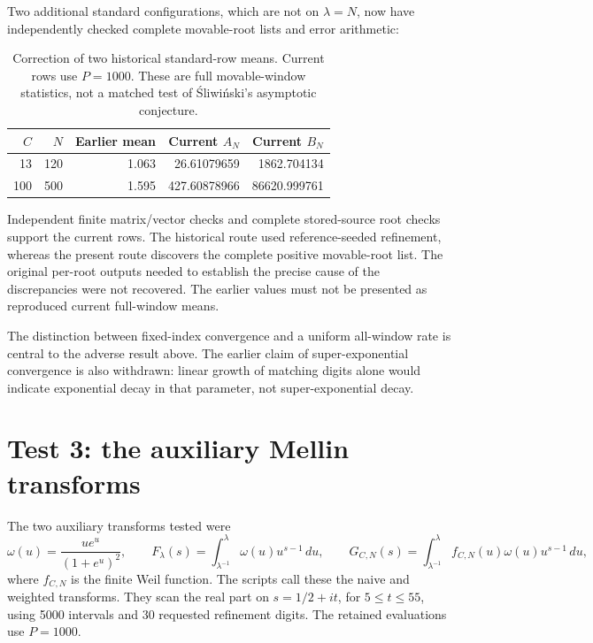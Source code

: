 \documentclass[11pt,a4paper]{article}
\begin{document}
Two additional standard configurations, which are not on
$\lambda=N$, now have independently checked complete movable-root
lists and error arithmetic:

\begin{table}[htbp]
\centering\small
\caption{Correction of two historical standard-row means.
Current rows use $P=1000$. These are full movable-window statistics,
not a matched test of \'Sliwi\'nski's asymptotic conjecture.}
\label{tab:standard}
\begin{tabular}{@{}rrrrr@{}}
\toprule
$C$ & $N$ & Earlier mean & Current $A_N$ & Current $B_N$ \\
\midrule
13 & 120 & 1.063 & 26.61079659 & 1862.704134 \\
100 & 500 & 1.595 & 427.60878966 & 86620.999761 \\
\bottomrule
\end{tabular}
\end{table}

Independent finite matrix/vector checks and complete stored-source
root checks support the current rows. The historical route used
reference-seeded refinement, whereas the present route discovers
the complete positive movable-root list. The original per-root
outputs needed to establish the precise cause of the discrepancies
were not recovered. The earlier values must not be presented as
reproduced current full-window means.

The distinction between fixed-index convergence and a uniform
all-window rate is central to the adverse result above. The earlier
claim of super-exponential convergence is also withdrawn: linear
growth of matching digits alone would indicate exponential decay
in that parameter, not super-exponential decay.

\section{Test 3: the auxiliary Mellin transforms}
\label{sec:transforms}

The two auxiliary transforms tested were
\[
 \omega(u)=\frac{u e^u}{(1+e^u)^2},\qquad
 F_\lambda(s)=\int_{\lambda^{-1}}^\lambda\omega(u)u^{s-1}\,du,
 \qquad
 G_{C,N}(s)=\int_{\lambda^{-1}}^\lambda f_{C,N}(u)\omega(u)u^{s-1}\,du,
\]
where $f_{C,N}$ is the finite Weil function. The scripts call these
the naive and weighted transforms. They scan the real part on
$s=1/2+it$, for $5\leq t\leq55$, using 5000 intervals and 30
requested refinement digits. The retained evaluations use $P=1000$.
\end{document}
